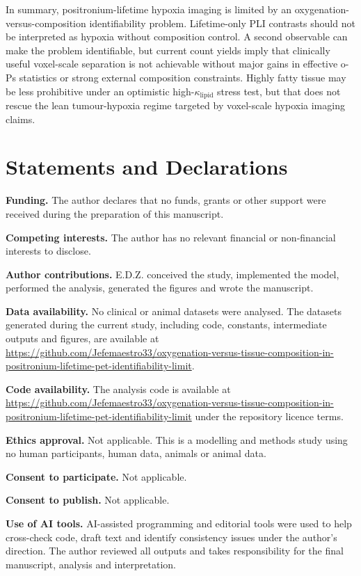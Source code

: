 \documentclass[pdflatex,sn-mathphys-num]{sn-jnl}
\begin{document}
In summary, positronium-lifetime hypoxia imaging is limited by an oxygenation-versus-composition identifiability problem. Lifetime-only PLI contrasts should not be interpreted as hypoxia without composition control. A second observable can make the problem identifiable, but current count yields imply that clinically useful voxel-scale separation is not achievable without major gains in effective o-Ps statistics or strong external composition constraints. Highly fatty tissue may be less prohibitive under an optimistic high-\(\kappa_{\mathrm{lipid}}\) stress test, but that does not rescue the lean tumour-hypoxia regime targeted by voxel-scale hypoxia imaging claims.

\section*{Statements and Declarations}\label{statements-and-declarations}

\textbf{Funding.} The author declares that no funds, grants or other support were received during the preparation of this manuscript.

\textbf{Competing interests.} The author has no relevant financial or non-financial interests to disclose.

\textbf{Author contributions.} E.D.Z. conceived the study, implemented the model, performed the analysis, generated the figures and wrote the manuscript.

\textbf{Data availability.} No clinical or animal datasets were analysed. The datasets generated during the current study, including code, constants, intermediate outputs and figures, are available at \url{https://github.com/Jefemaestro33/oxygenation-versus-tissue-composition-in-positronium-lifetime-pet-identifiability-limit}.

\textbf{Code availability.} The analysis code is available at \url{https://github.com/Jefemaestro33/oxygenation-versus-tissue-composition-in-positronium-lifetime-pet-identifiability-limit} under the repository licence terms.

\textbf{Ethics approval.} Not applicable. This is a modelling and methods study using no human participants, human data, animals or animal data.

\textbf{Consent to participate.} Not applicable.

\textbf{Consent to publish.} Not applicable.

\textbf{Use of AI tools.} AI-assisted programming and editorial tools were used to help cross-check code, draft text and identify consistency issues under the author's direction. The author reviewed all outputs and takes responsibility for the final manuscript, analysis and interpretation.
\end{document}
